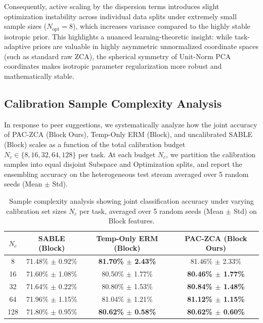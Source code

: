 Consequently, active scaling by the dispersion terms introduces slight optimization instability across individual data splits under extremely small sample sizes ($N_{\text{opt}} = 8$), which increases variance compared to the highly stable isotropic prior. This highlights a nuanced learning-theoretic insight: while task-adaptive priors are valuable in highly asymmetric unnormalized coordinate spaces (such as standard raw ZCA), the spherical symmetry of Unit-Norm PCA coordinates makes isotropic parameter regularization more robust and mathematically stable.

\subsection{Calibration Sample Complexity Analysis}
In response to peer suggestions, we systematically analyze how the joint accuracy of PAC-ZCA (Block Ours), Temp-Only ERM (Block), and uncalibrated SABLE (Block) scales as a function of the total calibration budget $N_c \in \{8, 16, 32, 64, 128\}$ per task. At each budget $N_c$, we partition the calibration samples into equal disjoint Subspace and Optimization splits, and report the ensembling accuracy on the heterogeneous test stream averaged over 5 random seeds (Mean $\pm$ Std).

\begin{table}[t]
\caption{Sample complexity analysis showing joint classification accuracy under varying calibration set sizes $N_c$ per task, averaged over 5 random seeds (Mean $\pm$ Std) on Block features.}
\label{tab:sample_complexity}
\centering
\small
\begin{tabular}{cccc}
\toprule
$N_c$ & \textbf{SABLE (Block)} & \textbf{Temp-Only ERM (Block)} & \textbf{PAC-ZCA (Block Ours)} \\
\midrule
8 & 71.48\% $\pm$ 0.92\% & \textbf{81.70\% $\pm$ 2.43\%} & 81.46\% $\pm$ 2.33\% \\
16 & 71.60\% $\pm$ 1.08\% & 80.50\% $\pm$ 1.77\% & \textbf{80.46\% $\pm$ 1.77\%} \\
32 & 71.64\% $\pm$ 0.22\% & 80.80\% $\pm$ 1.53\% & \textbf{80.84\% $\pm$ 1.48\%} \\
64 & 71.96\% $\pm$ 1.15\% & 81.04\% $\pm$ 1.21\% & \textbf{81.12\% $\pm$ 1.15\%} \\
128 & 71.80\% $\pm$ 0.95\% & \textbf{80.62\% $\pm$ 0.58\%} & \textbf{80.62\% $\pm$ 0.60\%} \\
\bottomrule
\end{tabular}
\end{table}

